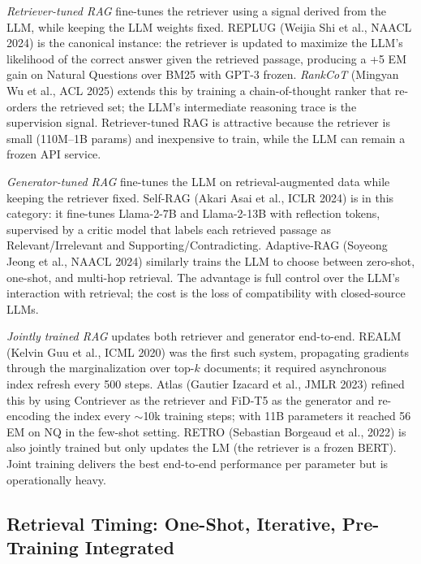 \documentclass{article}
\begin{document}
\emph{Retriever-tuned RAG} fine-tunes the retriever using a signal derived from the LLM, while keeping the LLM weights fixed. REPLUG (Weijia Shi et al., NAACL 2024) is the canonical instance: the retriever is updated to maximize the LLM's likelihood of the correct answer given the retrieved passage, producing a +5 EM gain on Natural Questions over BM25 with GPT-3 frozen. \emph{RankCoT} (Mingyan Wu et al., ACL 2025) extends this by training a chain-of-thought ranker that re-orders the retrieved set; the LLM's intermediate reasoning trace is the supervision signal. Retriever-tuned RAG is attractive because the retriever is small (110M--1B params) and inexpensive to train, while the LLM can remain a frozen API service.

\emph{Generator-tuned RAG} fine-tunes the LLM on retrieval-augmented data while keeping the retriever fixed. Self-RAG (Akari Asai et al., ICLR 2024) is in this category: it fine-tunes Llama-2-7B and Llama-2-13B with reflection tokens, supervised by a critic model that labels each retrieved passage as Relevant/Irrelevant and Supporting/Contradicting. Adaptive-RAG (Soyeong Jeong et al., NAACL 2024) similarly trains the LLM to choose between zero-shot, one-shot, and multi-hop retrieval. The advantage is full control over the LLM's interaction with retrieval; the cost is the loss of compatibility with closed-source LLMs.

\emph{Jointly trained RAG} updates both retriever and generator end-to-end. REALM (Kelvin Guu et al., ICML 2020) was the first such system, propagating gradients through the marginalization over top-\(k\) documents; it required asynchronous index refresh every 500 steps. Atlas (Gautier Izacard et al., JMLR 2023) refined this by using Contriever as the retriever and FiD-T5 as the generator and re-encoding the index every $\sim$10k training steps; with 11B parameters it reached 56 EM on NQ in the few-shot setting. RETRO (Sebastian Borgeaud et al., 2022) is also jointly trained but only updates the LM (the retriever is a frozen BERT). Joint training delivers the best end-to-end performance per parameter but is operationally heavy.

\subsection{Retrieval Timing: One-Shot, Iterative, Pre-Training Integrated}\label{retrieval-timing-one-shot-iterative-pre-training-integrated}
\end{document}
